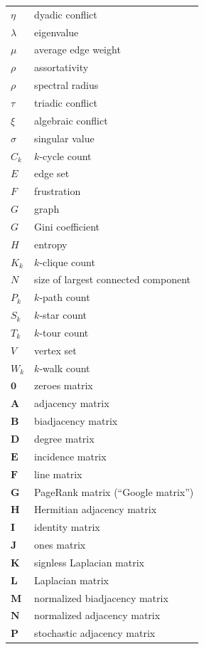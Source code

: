 \documentclass{article}
\begin{document}
\begin{longtable}{ll}
  $\eta$ & dyadic conflict \\
  $\lambda$ & eigenvalue \\
  $\mu$  & average edge weight \\
  $\rho$ & assortativity \\
  $\rho$ & spectral radius \\
  $\tau$ & triadic conflict \\
  $\xi$  & algebraic conflict \\
  $\sigma$ & singular value \\
\midrule
  $C_k$ & $k$-cycle count \\
  $E$ & edge set \\
  $F$ & frustration \\
  $G$ & graph \\
  $G$ & Gini coefficient \\
  $H$ & entropy \\
  $K_k$ & $k$-clique count \\
  $N$   & size of largest connected component\\
  $P_k$ & $k$-path count \\
  $S_k$ & $k$-star count \\
  $T_k$ & $k$-tour count \\
  $V$   & vertex set \\
  $W_k$ & $k$-walk count \\
\midrule
  $\mathbf 0$ & zeroes matrix \\
  $\mathbf A$ & adjacency matrix \\
  $\mathbf B$ & biadjacency matrix \\
  $\mathbf D$ & degree matrix \\
  $\mathbf E$ & incidence matrix \\ 
  $\mathbf F$ & line matrix \\
  $\mathbf G$ & PageRank matrix (``Google matrix'') \\
  $\mathbf H$ & Hermitian adjacency matrix \\
  $\mathbf I$ & identity matrix \\
  $\mathbf J$ & ones matrix \\
  $\mathbf K$ & signless Laplacian matrix \\
  $\mathbf L$ & Laplacian matrix \\
  $\mathbf M$ & normalized biadjacency matrix \\
  $\mathbf N$ & normalized adjacency matrix \\
  $\mathbf P$ & stochastic adjacency matrix \\

\end{longtable}
\end{document}
